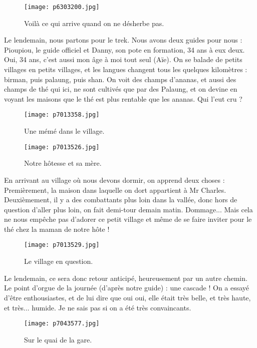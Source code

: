 \documentclass{book}
\begin{document}
\begin{figure}[h]
\centering
\texttt{[image: p6303200.jpg]}
\caption*{Voilà ce qui arrive quand on ne désherbe pas.}
\end{figure}

Le lendemain, nous partons pour le trek. Nous avons deux guides pour nous : Pioupiou, le guide officiel et Danny, son pote en formation, 34 ans à eux deux. Oui, 34 ans, c'est aussi mon âge à moi tout seul (Aïe). On se balade de petits villages en petits villages, et les langues changent tous les quelques kilomètres : birman, puis palaung, puis shan. On voit des champs d'ananas, et aussi des champs de thé qui ici, ne sont cultivés que par des Palaung, et on devine en voyant les maisons que le thé est plus rentable que les ananas. Qui l'eut cru ?


\begin{figure}[h]
\centering
\texttt{[image: p7013358.jpg]}
\caption*{Une mémé dans le village.}
\end{figure}


\begin{figure}[h]
\centering
\texttt{[image: p7013526.jpg]}
\caption*{Notre hôtesse et sa mère.}
\end{figure}

En arrivant au village où nous devons dormir, on apprend deux choses : Premièrement, la maison dans laquelle on dort appartient à Mr Charles. Deuxièmement, il y a des combattants plus loin dans la vallée, donc hors de question d'aller plus loin, on fait demi-tour demain matin. Dommage... Mais cela ne nous empêche pas d'adorer ce petit village et même de se faire inviter pour le thé chez la maman de notre hôte !


\begin{figure}[h]
\centering
\texttt{[image: p7013529.jpg]}
\caption*{Le village en question.}
\end{figure}

Le lendemain, ce sera donc retour anticipé, heureusement par un autre chemin. Le point d'orgue de la journée (d'après notre guide) : une cascade ! On a essayé d'être enthousiastes, et de lui dire que oui oui, elle était très belle, et très haute, et très... humide. Je ne sais pas si on a été très convaincants.


\begin{figure}[h]
\centering
\texttt{[image: p7043577.jpg]}
\caption*{Sur le quai de la gare.}
\end{figure}
\end{document}
